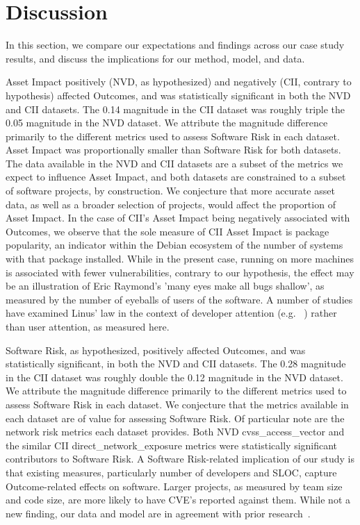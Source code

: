 \section{Discussion}
\label{sec:discussion}

In this section, we compare our expectations and findings across our case study results, and discuss the implications for our method, model, and data.

%		
Asset Impact positively (NVD, as hypothesized) and negatively (CII, contrary to hypothesis) affected Outcomes, and was statistically significant in both the NVD and CII datasets. The 0.14 magnitude in the CII dataset was roughly triple the 0.05 magnitude in the NVD dataset. We attribute the magnitude difference primarily to the different metrics used to assess Software Risk in each dataset. Asset Impact was proportionally smaller than Software Risk for both datasets. The data available in the NVD and CII datasets are a subset of the metrics we expect to influence Asset Impact, and both datasets are constrained to a subset of software projects, by construction. We conjecture that more accurate asset data, as well as a broader selection of projects, would affect the proportion of Asset Impact. In the case of CII's Asset Impact being negatively associated with Outcomes, we observe that the sole measure of CII Asset Impact is package popularity, an indicator within the Debian ecosystem of the number of systems with that package installed. While in the present case, running on more machines is associated with fewer vulnerabilities, contrary to our hypothesis, the effect may be an illustration of Eric Raymond's 'many eyes make all bugs shallow', as measured by the number of eyeballs of users of the software. A number of studies have examined Linus' law in the context of developer attention (e.g. ~\cite{meneely2013when}) rather than user attention, as measured here. 

Software Risk, as hypothesized, positively affected Outcomes, and was statistically significant, in both the NVD and CII datasets. The 0.28 magnitude in the CII dataset was roughly double the 0.12 magnitude in the NVD dataset. We attribute the magnitude difference primarily to the different metrics used to assess Software Risk in each dataset. We conjecture that the metrics available in each dataset are of value for assessing Software Risk.  Of particular note are the network risk metrics each dataset provides. Both NVD cvss\_access\_vector and the similar CII direct\_network\_exposure metrics were statistically significant contributors to Software Risk. A Software Risk-related implication of our study is that existing measures, particularly number of developers and SLOC, capture Outcome-related effects on software. Larger projects, as measured by team size and code size, are more likely to have CVE's reported against them. While not a new finding, our data and model are in agreement with prior research~\cite{shin2011evaluating,meneely2013when}.

